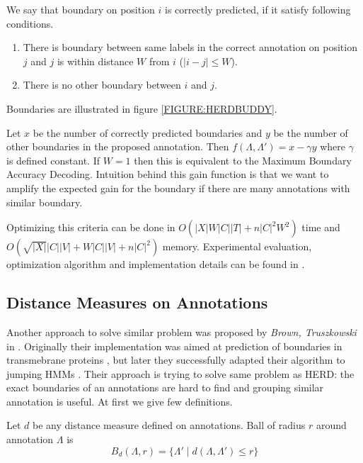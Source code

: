 We say that boundary on position $i$ is correctly predicted, if it satisfy
following conditions.
\begin{enumerate}
\item There is boundary between same labels in the correct annotation on position $j$ and $j$ is
within distance $W$ from $i$ ($|i-j|\leq W$).
\item There is no other boundary between $i$ and $j$. 
\end{enumerate}
Boundaries are illustrated in figure \ref{FIGURE:HERDBUDDY}. 

Let $x$ be the number of correctly
predicted boundaries and $y$ be the number of other boundaries in the proposed
annotation. Then $f(\Lambda,\Lambda')=x-\gamma y$ where $\gamma$ is defined
constant. If $W=1$ then this is equivalent to the Maximum Boundary Accuracy
Decoding. Intuition behind this gain function is that we want to amplify the   
expected gain for the boundary if there are many annotations with similar
boundary.

Optimizing this criteria can be done in $O(|X|W|C||T| + n|C|^2W^2)$ time  and
$O(\sqrt{|X|}|C||V|+W|C||V|+n|C|^2)$ memory. Experimental evaluation,
optimization algorithm and implementation details can be found in
\cite{Nanasi2010,Nanasi2010mgr}.

\subsection{Distance Measures on Annotations}

Another approach to solve similar problem was proposed by {\it Brown,
Truszkowski} in \cite{Brown2010}. Originally their implementation was aimed at
prediction of boundaries in transmebrane proteins \cite{Brown2010}, but later
they successfully adapted their algorithm to jumping HMMs \cite{Truszkowski2011}.
Their approach is trying to solve same problem as HERD: the exact boundaries of
an annotations are hard to find and grouping similar annotation is useful.
At first we give few definitions.

\begin{definition}
Let $d$ be any distance measure defined on annotations. Ball of radius $r$
around annotation $\Lambda$ is 
\begin{equation*}
B_d(\Lambda,r) = \{\Lambda'\mid d(\Lambda,\Lambda')\leq r\}
\end{equation*}
\end{definition}

